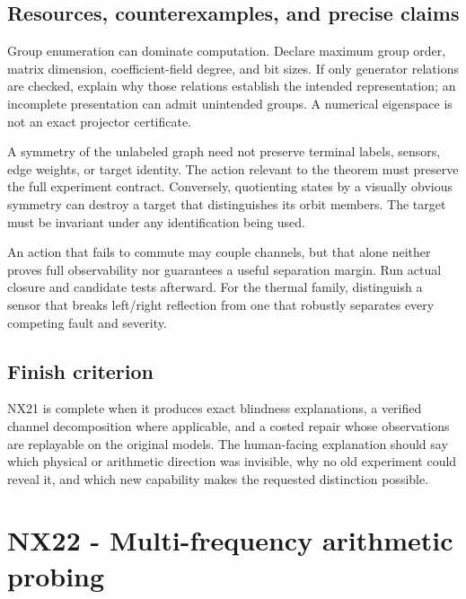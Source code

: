 \documentclass[
  11pt,
  a4paper,
]{report}
\begin{document}
\hypertarget{resources-counterexamples-and-precise-claims}{%
\section{Resources, counterexamples, and precise
claims}\label{resources-counterexamples-and-precise-claims}}

Group enumeration can dominate computation. Declare maximum group order,
matrix dimension, coefficient-field degree, and bit sizes. If only
generator relations are checked, explain why those relations establish
the intended representation; an incomplete presentation can admit
unintended groups. A numerical eigenspace is not an exact projector
certificate.

A symmetry of the unlabeled graph need not preserve terminal labels,
sensors, edge weights, or target identity. The action relevant to the
theorem must preserve the full experiment contract. Conversely,
quotienting states by a visually obvious symmetry can destroy a target
that distinguishes its orbit members. The target must be invariant under
any identification being used.

An action that fails to commute may couple channels, but that alone
neither proves full observability nor guarantees a useful separation
margin. Run actual closure and candidate tests afterward. For the
thermal family, distinguish a sensor that breaks left/right reflection
from one that robustly separates every competing fault and severity.

\hypertarget{finish-criterion-1}{%
\section{Finish criterion}\label{finish-criterion-1}}

NX21 is complete when it produces exact blindness explanations, a
verified channel decomposition where applicable, and a costed repair
whose observations are replayable on the original models. The
human-facing explanation should say which physical or arithmetic
direction was invisible, why no old experiment could reveal it, and
which new capability makes the requested distinction possible.

\hypertarget{nx22---multi-frequency-arithmetic-probing}{%
\chapter{NX22 - Multi-frequency arithmetic
probing}\label{nx22---multi-frequency-arithmetic-probing}}
\end{document}
